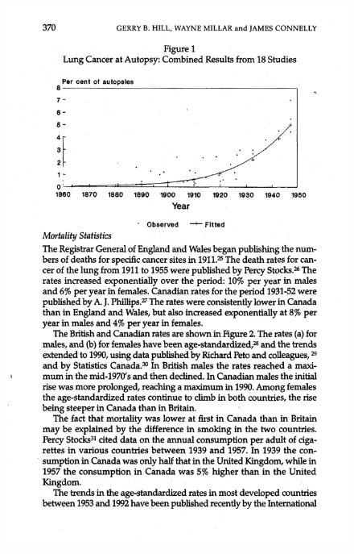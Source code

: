 \documentclass{beamer}
\begin{document}
\begin{frame}[plain, shrink=20]
	\begin{figure}
	\includegraphics[scale=0.75]{./lecture_includes/cancer_fig1.pdf}
	\end{figure}


\end{frame}
\end{document}
